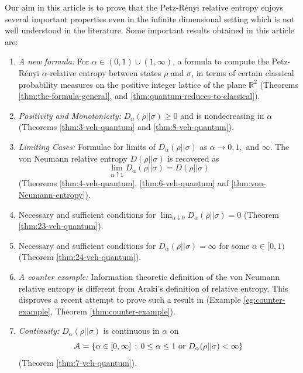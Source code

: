 \documentclass[12pt,a4paper,oneside]{article}
\numberwithin{equation}{section}
\theoremstyle{definition}  %
\theoremstyle{plain}  %
\theoremstyle{remark} %
\newcommand{\BR}{\mathbb{R}}
\begin{document}
 Our aim in this article is to prove that the Petz-R\'enyi relative entropy enjoys several important properties  even in the infinite dimensional setting which is not well understood in the literature.
Some important results obtained in this article are: \begin{enumerate}
    \item \textit{A new formula:} For $\alpha\in (0,1)\cup (1,\infty)$, a formula to compute the Petz-R\'enyi $\alpha$-relative entropy between states $\rho$ and $\sigma$, in terms of certain  classical probability measures on the positive integer lattice of the plane $\BR^2$ (Theorems \ref{thm:the-formula-general}, and \ref{thm:quantum-reduces-to-classical}).
    
    \item \textit{Positivity and Monotonicity:} $D_{\alpha}(\rho||\sigma)\geq 0$ and  is  nondecreasing in $\alpha$  (Theorems \ref{thm:3-veh-quantum} and \ref{thm:8-veh-quantum}).
    
    \item \textit{Limiting Cases:} Formulae for limits of $D_{\alpha}(\rho||\sigma)$ as $\alpha\rightarrow 0, 1,$ and $\infty$. The von Neumann relative entropy $D(\rho||\sigma)$ is recovered as  \[\lim_{\alpha \uparrow 1} D_{\alpha}(\rho||\sigma) = D(\rho||\sigma)\](Theorems \ref{thm:4-veh-quantum}, \ref{thm:6-veh-quantum} anf \ref{thm:von-Neumann-entropy}).
    
   \item Necessary and sufficient conditions for $\lim_{\alpha\downarrow0}D_{\alpha}(\rho||\sigma) =0$ (Theorem \ref{thm:23-veh-quantum}).
   
    \item Necessary and sufficient conditions for $D_{\alpha}(\rho||\sigma) =\infty$ for some $\alpha\in [0,1)$ (Theorem \ref{thm:24-veh-quantum}).
  
    \item \textit{A counter example:} Information theoretic definition of the von Neumann relative entropy is different from Araki's definition of relative entropy. This disproves a recent attempt to prove  such a result in   \cite[Theorem 20]{luczak2019relative} (Example \ref{eg:counter-example}, Theorem \ref{thm:counter-example}).
    
    \item \textit{Continuity:}  $D_\alpha (\rho||\sigma)$  is continuous in $\alpha$ on \[\mathcal{A} = \{\alpha\in [0,\infty]\,:\, 0\leq \alpha\leq 1\textnormal{ or } D_{\alpha}(\rho||\sigma)<\infty\}\]
    (Theorem \ref{thm:7-veh-quantum}).
    

\end{enumerate}
\end{document}
